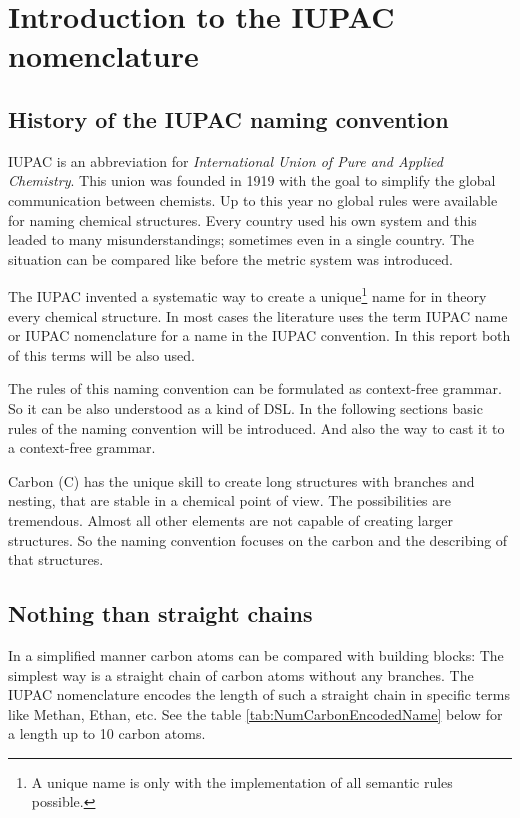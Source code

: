 \documentclass[
fontsize=11pt,
paper=a4,
abstract=true,
numbers=noenddot,
listof=totoc,
bibliography=totoc,
twoside,
open=right,
cleardoublepage=plain,
parskip=half+, %
BCOR=1cm, %
]{scrreprt}
\newcommand{\gerquot}[1]{\glqq#1\grqq}
\newcommand{\dashAndSpace}{\textendash \space}
\newcommand{\dashAndSpaceSeq}[1]{\dashAndSpace#1 \textendash}
\newcommand{\CFG}{context-free grammar}
\newcommand{\IUPAC}{International Union of Pure and Applied Chemistry}
\begin{document}
\chapter{Introduction to the IUPAC nomenclature}\label{s:IntroductionToTheIUPACNomenclature}
\section{History of the IUPAC naming convention}\label{ss:HistoryOfTheIUPACNamingConvention}
IUPAC is an abbreviation for \emph{\IUPAC}. This union was founded in 1919 with the goal to simplify the global communication between chemists. Up to this year no global rules were available for naming chemical structures. Every country used his own system and this leaded to many misunderstandings; sometimes even in a single country. The situation can be compared like before the metric system was introduced.

The IUPAC invented a systematic way to create a unique\footnote{A unique name is only with the implementation of all semantic rules possible.} name for \dashAndSpaceSeq{in theory} every chemical structure. In most cases the literature uses the term \gerquot{IUPAC name} or \gerquot{IUPAC nomenclature} for a name in the IUPAC convention. In this report both of this terms will be also used.

The rules of this naming convention can be formulated as \CFG. So it can be also understood as a kind of DSL. In the following sections basic rules of the naming convention will be introduced. And also the way to cast it to a \CFG.

Carbon (C) has the unique skill to create long structures with branches and nesting, that are stable \dashAndSpace in a chemical point of view. The possibilities are tremendous. Almost all other elements are not capable of creating larger structures. So the naming convention focuses on the carbon and the describing of that structures.



\section{Nothing than straight chains}\label{ss:NothingThanStraightChains}
In a simplified manner carbon atoms can be compared with building blocks: The simplest way is a straight chain of carbon atoms without any branches. The IUPAC nomenclature encodes the length of such a straight chain in specific terms like \gerquot{Methan}, \gerquot{Ethan}, etc. See the table \ref{tab:NumCarbonEncodedName} below for a length up to 10 carbon atoms.
\end{document}
